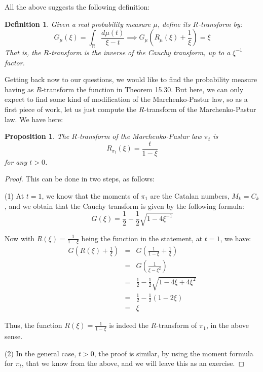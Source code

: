 \documentclass[12pt]{amsbook}
\newtheorem{definition}[theorem]{Definition}
\newtheorem{proposition}[theorem]{Proposition}
\begin{document}
All the above suggests the following definition:

\begin{definition}
Given a real probability measure $\mu$, define its $R$-transform by:
$$G_\mu(\xi)=\int_\mathbb R\frac{d\mu(t)}{\xi-t}\implies 
G_\mu\left(R_\mu(\xi)+\frac{1}{\xi}\right)=\xi$$
That is, the $R$-transform is the inverse of the Cauchy transform, up to a $\xi^{-1}$ factor.
\end{definition}

Getting back now to our questions, we would like to find the probability measure having as $R$-transform the function in Theorem 15.30. But here, we can only expect to find some kind of modification of the Marchenko-Pastur law, so as a first piece of work, let us just compute the $R$-transform of the Marchenko-Pastur law. We have here:

\begin{proposition}
The $R$-transform of the Marchenko-Pastur law $\pi_t$ is
$$R_{\pi_t}(\xi)=\frac{t}{1-\xi}$$ 
for any $t>0$.
\end{proposition}

\begin{proof}
This can be done in two steps, as follows:

\medskip

(1) At $t=1$, we know that the moments of $\pi_1$ are the Catalan numbers, $M_k=C_k$, and we obtain that the Cauchy transform is given by the following formula:
$$G(\xi)=\frac{1}{2}-\frac{1}{2}\sqrt{1-4\xi^{-1}}$$

Now with $R(\xi)=\frac{1}{1-\xi}$ being the function in the statement, at $t=1$, we have:
\begin{eqnarray*}
G\left(R(\xi)+\frac{1}{\xi}\right)
&=&G\left(\frac{1}{1-\xi}+\frac{1}{\xi}\right)\\
&=&G\left(\frac{1}{\xi-\xi^2}\right)\\
&=&\frac{1}{2}-\frac{1}{2}\sqrt{1-4\xi+4\xi^2}\\
&=&\frac{1}{2}-\frac{1}{2}(1-2\xi)\\
&=&\xi
\end{eqnarray*}

Thus, the function $R(\xi)=\frac{1}{1-\xi}$ is indeed the $R$-transform of $\pi_1$, in the above sense.

\medskip

(2) In the general case, $t>0$, the proof is similar, by using the moment formula for $\pi_t$, that we know from the above, and we will leave this as an exercise. 
\end{proof}
\end{document}

